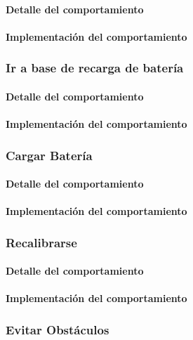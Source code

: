 \paragraph{Detalle del comportamiento}
\paragraph{Implementaci\'on del comportamiento}

\subsubsection{Ir a base de recarga de bater\'ia}
\label{go_to_recharge}
\paragraph{Detalle del comportamiento}
\paragraph{Implementaci\'on del comportamiento}

\subsubsection{Cargar Bater\'ia}
\label{recharge_battery}
\paragraph{Detalle del comportamiento}
\paragraph{Implementaci\'on del comportamiento}

\subsubsection{Recalibrarse}
\label{recalibrate}
\paragraph{Detalle del comportamiento}
\paragraph{Implementaci\'on del comportamiento}

\subsubsection{Evitar Obst\'aculos}
\label{avoid_obstacles}
